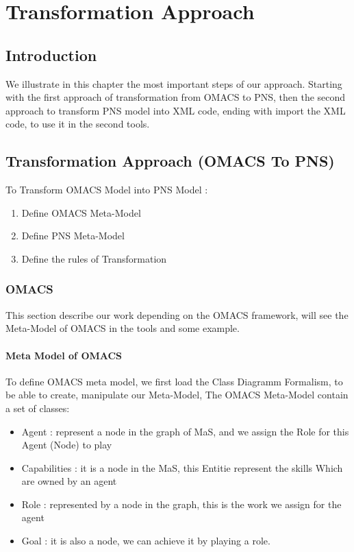 
\chapter{\label{cha: Transformation Approach } Transformation Approach}
\section{Introduction}
We illustrate in this chapter the most important steps of our approach. Starting with the first
approach of transformation from OMACS to PNS, then the second approach to transform
PNS model into XML code, ending with import the XML code, to use it in the second tools.

\section{Transformation Approach (OMACS To PNS)\label{sec:OMACS into PNS} }%
To Transform OMACS Model into PNS Model :
\begin{enumerate}
\item Define OMACS Meta-Model 
\item Define PNS Meta-Model
\item Define the rules of Transformation
\end{enumerate}


\subsection{OMACS} 
This section describe our work depending on the OMACS framework, will see the Meta-Model of OMACS in the tools and some example. 
\subsubsection{Meta Model of OMACS}
\vspace{0.5cm}
To define OMACS meta model, we first load the Class Diagramm Formalism, to be able to create, manipulate our Meta-Model,
The OMACS Meta-Model contain a set of classes:
\pagebreak
\begin{itemize}
\newcommand{\localtextbulletone}{\textcolor{gray}{\raisebox{.45ex}{\rule{.6ex}{.6ex}}}}
\renewcommand{\labelitemi}{\localtextbulletone}
	\item Agent : represent a node in the graph of MaS, and we assign the Role for this Agent (Node) to play 
	\item Capabilities : it is a node in the MaS, this Entitie represent the skills Which are owned by an agent
	\item Role : represented by a node in the graph, this is the work we assign for the agent 
	\item Goal : it is also a node, we can achieve it by playing a role.
\end{itemize}
 
